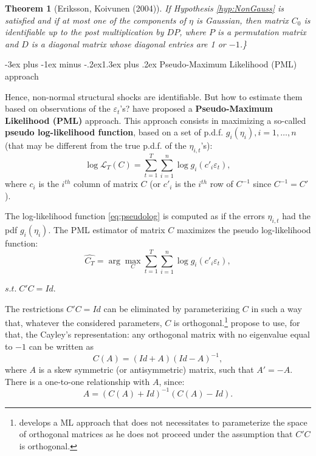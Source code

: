 \documentclass[
  11pt,
]{book}
\makeatletter
\renewcommand\section{\@startsection{section}{1}{\z@}
  {-3ex plus -1ex minus -.2ex}{1.3ex plus .2ex}
  {\normalfont\Large\bfseries\color{TextbookInk}}}
\newtheorem{theorem}{Theorem}[chapter]
\theoremstyle{definition}
\theoremstyle{definition}
\theoremstyle{definition}
\theoremstyle{definition}
\theoremstyle{remark}
\makeatother
\begin{document}
\begin{theorem}[Eriksson, Koivunen (2004)]
\protect\hypertarget{thm:EK2004}{}\label{thm:EK2004}If Hypothesis \ref{hyp:NonGauss} is satisfied and if at most one of the components of \(\eta\) is Gaussian, then matrix \(C_0\) is identifiable up to the post multiplication by \(DP\), where \(P\) is a permutation matrix and \(D\) is a diagonal matrix whose diagonal entries are 1 or \(-1\).\}
\end{theorem}

\section{Pseudo-Maximum Likelihood (PML) approach}\label{pseudo-maximum-likelihood-pml-approach}

Hence, non-normal structural shocks are identifiable. But how to estimate them based on observations of the \(\varepsilon_t\)'s? \citet{Gourieroux_Monfort_Renne_2017} have proposed a \textbf{Pseudo-Maximum Likelihood (PML)} approach. This approach consists in maximizing a so-called \textbf{pseudo log-likelihood function}, based on a set of p.d.f. \(g_i (\eta_i), i=1,\ldots,n\) (that may be different from the true p.d.f. of the \(\eta_{i,t}\)'s):
\begin{equation}
\log \mathcal{L}_T (C) = \sum^T_{t=1} \sum^n_{i=1} \log g_i (c'_i \varepsilon_t),\label{eq:pseudolog}
\end{equation}
where \(c_i\) is the \(i^{th}\) column of matrix \(C\) (or \(c'_i\) is the \(i^{th}\) row of \(C^{-1}\) since \(C^{-1}=C'\)).

The log-likelihood function \eqref{eq:pseudolog} is computed as if the errors \(\eta_{i,t}\) had the pdf \(g_i (\eta_i)\). The PML estimator of matrix \(C\) maximizes the pseudo log-likelihood function:
\begin{equation}
\widehat{C_T} = \arg \max_C \sum^T_{t=1} \sum^n_{i=1} \log g_i (c'_i \varepsilon_t),\label{eq:optimprob}
\end{equation}

\centerline{$s.t. \;C'C = Id.$}

The restrictions \(C'C = Id\) can be eliminated by parameterizing \(C\) in such a way that, whatever the considered parameters, \(C\) is orthogonal.\footnote{\citet{Jarocinski_2021} develops a ML approach that does not necessitates to parameterize the space of orthogonal matrices as he does not proceed under the assumption that \(C'C\) is orthogonal.} \citet{Gourieroux_Monfort_Renne_2017} propose to use, for that, the Cayley's representation: any orthogonal matrix with no eigenvalue equal to \(-1\) can be written as
\begin{equation}
C(A) = (Id+A) (Id-A)^{-1},
\end{equation}
where \(A\) is a skew symmetric (or antisymmetric) matrix, such that \(A'=-A\). There is a one-to-one relationship with \(A\), since:
\begin{equation}
A = (C(A)+Id)^{-1} (C(A)-Id).
\end{equation}
\end{document}
